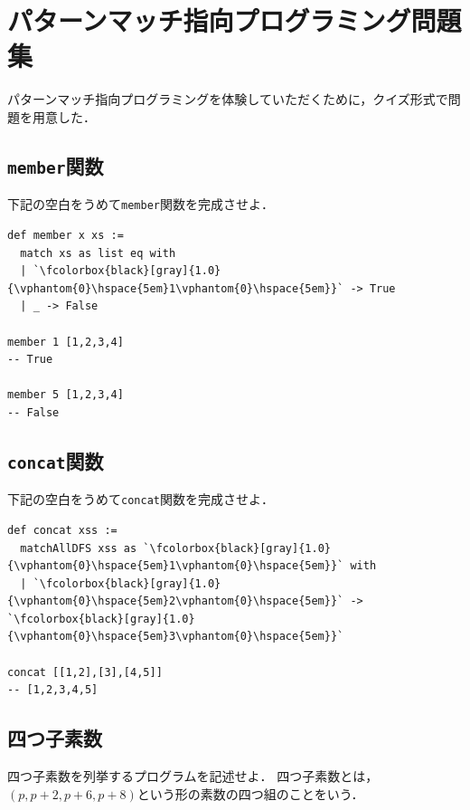 \chapter{パターンマッチ指向プログラミング問題集}

パターンマッチ指向プログラミングを体験していただくために，クイズ形式で問題を用意した．

\section*{\texttt{member}関数}

下記の空白をうめて\lstinline{member}関数を完成させよ．

\begin{lstlisting}[language=egison]
def member x xs :=
  match xs as list eq with
  | `\fcolorbox{black}[gray]{1.0}{\vphantom{0}\hspace{5em}1\vphantom{0}\hspace{5em}}` -> True
  | _ -> False

member 1 [1,2,3,4]
-- True

member 5 [1,2,3,4]
-- False
\end{lstlisting}

\section*{\texttt{concat}関数}

下記の空白をうめて\lstinline{concat}関数を完成させよ．

\begin{lstlisting}[language=egison]
def concat xss :=
  matchAllDFS xss as `\fcolorbox{black}[gray]{1.0}{\vphantom{0}\hspace{5em}1\vphantom{0}\hspace{5em}}` with
  | `\fcolorbox{black}[gray]{1.0}{\vphantom{0}\hspace{5em}2\vphantom{0}\hspace{5em}}` -> `\fcolorbox{black}[gray]{1.0}{\vphantom{0}\hspace{5em}3\vphantom{0}\hspace{5em}}`

concat [[1,2],[3],[4,5]]
-- [1,2,3,4,5]
\end{lstlisting}

\section*{四つ子素数}

四つ子素数を列挙するプログラムを記述せよ．
四つ子素数とは，$(p,p + 2,p + 6,p + 8)$という形の素数の四つ組のことをいう．

